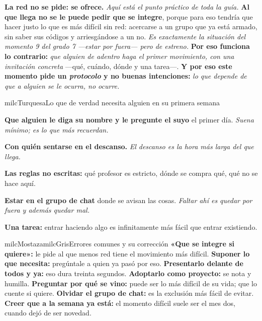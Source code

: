 \documentclass[11pt,letterpaper]{article}
\newcommand{\milcpaso}[3]{%
\Needspace{4\baselineskip}%
\begin{tcolorbox}[enhanced,colback=white,colframe=milcLinea,arc=1.5mm,boxrule=.9pt,
  left=14mm,right=4mm,top=3mm,bottom=3mm,before skip=4pt,after skip=4pt,
  fontupper=\RaggedRight,
  overlay={\node[anchor=north west,circle,fill=#2,text=white,inner sep=0pt,
    minimum size=7.4mm,font=\sffamily\bfseries\small]
    at ([xshift=3.6mm,yshift=-3.2mm]frame.north west) {#1};}]
#3
\end{tcolorbox}}
\begin{document}
\milcpaso{4}{milcTurquesa}{\textbf{La red no se pide: se ofrece.} \emph{Aquí está el punto práctico de toda la guía.} \textbf{Al que llega no se le puede pedir que se integre}, porque para eso tendría que hacer justo lo que es más difícil sin red: acercarse a un grupo que ya está armado, sin saber sus códigos y arriesgándose a un no. \emph{Es exactamente la situación del momento 9 del grado 7 ---estar por fuera--- pero de estreno.} \textbf{Por eso funciona lo contrario:} \emph{que alguien de adentro haga el primer movimiento, con una invitación concreta} ---qué, cuándo, dónde y una tarea---. \textbf{Y por eso este momento pide un \emph{protocolo} y no buenas intenciones:} \emph{lo que depende de que a alguien se le ocurra, no ocurre.}}

\begin{drawbox}{milcTurquesa}{Lo que de verdad necesita alguien en su primera semana}
\begin{pasoslista}
\item \textbf{Que alguien le diga su nombre y le pregunte el suyo} el primer día. \emph{Suena mínimo; es lo que más recuerdan.}
\item \textbf{Con quién sentarse en el descanso.} \emph{El descanso es la hora más larga del que llega.}
\item \textbf{Las reglas no escritas:} qué profesor es estricto, dónde se compra qué, qué no se hace aquí.
\item \textbf{Estar en el grupo de chat} donde se avisan las cosas. \emph{Faltar ahí es quedar por fuera y además quedar mal.}
\item \textbf{Una tarea:} entrar haciendo algo es infinitamente más fácil que entrar existiendo.
\end{pasoslista}
\end{drawbox}

\begin{softbox}{milcMostaza}{milcGris}{Errores comunes y su corrección}
\textbf{«Que se integre si quiere»:} le pide al que menos red tiene el movimiento más difícil. \textbf{Suponer lo que necesita:} pregúntale a quien ya pasó por eso. \textbf{Presentarlo delante de todos y ya:} eso dura treinta segundos. \textbf{Adoptarlo como proyecto:} se nota y humilla. \textbf{Preguntar por qué se vino:} puede ser lo más difícil de su vida; que lo cuente si quiere. \textbf{Olvidar el grupo de chat:} es la exclusión más fácil de evitar. \textbf{Creer que a la semana ya está:} el momento difícil suele ser el mes dos, cuando dejó de ser novedad.
\end{softbox}
\end{document}
